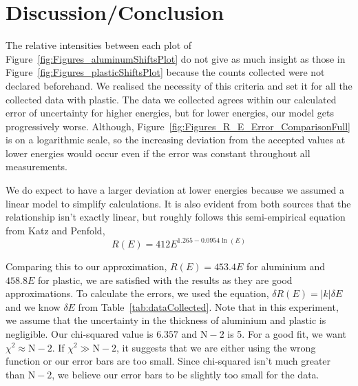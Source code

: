 
\section{Discussion/Conclusion}

\label{sec:discussion_conclusion} The relative intensities between each plot of Figure~\ref{fig:Figures_aluminumShiftsPlot} do not give as much insight as those in Figure~\ref{fig:Figures_plasticShiftsPlot} because the counts collected were not declared beforehand. We realised the necessity of this criteria and set it for all the collected data with plastic. The data we collected agrees within our calculated error of uncertainty for higher energies, but for lower energies, our model gets progressively worse. Although, Figure~\ref{fig:Figures_R_E_Error_ComparisonFull} is on a logarithmic scale, so the increasing deviation from the accepted values at lower energies would occur even if the error was constant throughout all measurements. 

We do expect to have a larger deviation at lower energies because we assumed a linear model to simplify calculations. It is also evident from both sources that the relationship isn't exactly linear, but roughly follows this semi-empirical equation from Katz and Penfold,\cite{RevModPhys.24.28} 
\begin{equation}
	R(E) = 412 E^{1.265 - 0.0954 \ln(E)} \label{eq:acceptedEq} 
\end{equation}

Comparing this to our approximation, $R(E) = 453.4 E$ for aluminium and $458.8 E$ for plastic, we are satisfied with the results as they are good approximations.   To calculate the errors, we used the equation,\cite{093570275X} $\delta R(E) = |k| \delta E$ and we know $\delta E$ from Table~\ref{tab:dataCollected}. Note that in this experiment, we assume that the uncertainty in the thickness of aluminium and plastic is negligible.  Our chi-squared value is $6.357$ and $\text{N}-2$ is 5.  For a good fit, we want $\chi^2\approx \text{N}-2$.  If $\chi^2 \gg \text{N}-2$, it suggests that we are either using the wrong function or our error bars are too small.\cite{garcia2000numerical}  Since chi-squared isn't much greater than $\text{N}-2$, we believe our error bars to be slightly too small for the data.

